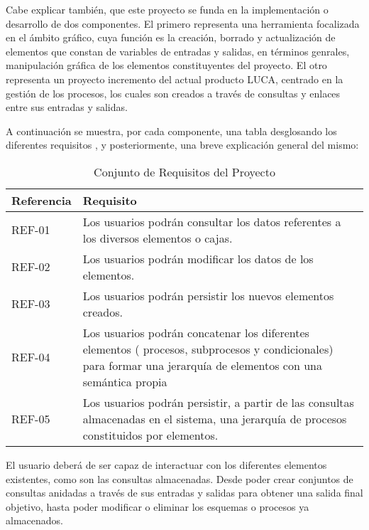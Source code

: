 		\vspace{5mm}
		
		Cabe explicar también, que este proyecto se funda en la implementación o desarrollo de dos componentes. El primero representa una herramienta focalizada en el ámbito gráfico, cuya función es la creación, borrado y actualización de elementos que constan de variables de entradas y salidas, en términos genrales, manipulación gráfica de los elementos constituyentes del proyecto. El otro representa un proyecto incremento del actual producto LUCA, centrado en la gestión de los procesos, los cuales son creados a través de consultas y enlaces entre sus entradas y salidas.
		
		\vspace{5mm}
		A continuación se muestra, por cada componente, una tabla desglosando los diferentes requisitos , y posteriormente, una breve explicación general del mismo:
		
		
		\begin{table}[H]
			\begin{center}
				\begin{tabular}{|l|l|}
					\hline
					Referencia & Requisito \\
					\hline \hline
					REF-01 & Los usuarios podrán consultar los datos referentes a los diversos elementos o cajas. \\ \hline
					REF-02 & Los usuarios podrán modificar los datos de los elementos. \\ \hline
					REF-03 & Los usuarios podrán persistir los nuevos elementos creados. \\ \hline
					REF-04 & Los usuarios podrán concatenar los diferentes elementos ( procesos, subprocesos y condicionales) para formar una jerarquía de elementos con una semántica propia\\ \hline
					REF-05 & Los usuarios podrán persistir, a partir de las consultas almacenadas en el sistema, una jerarquía de procesos constituidos por elementos. \\ \hline

				\end{tabular}
				\caption{Conjunto de Requisitos del Proyecto}
				\label{tabla:requisitosProceso}
			\end{center}
		\end{table}
	
		\vspace{5mm}

		El usuario deberá de ser capaz de interactuar con los diferentes elementos existentes, como son las consultas almacenadas. Desde poder crear conjuntos de consultas anidadas a través de sus entradas y salidas para obtener una salida final objetivo, hasta poder modificar o eliminar los esquemas o procesos ya almacenados.
	

